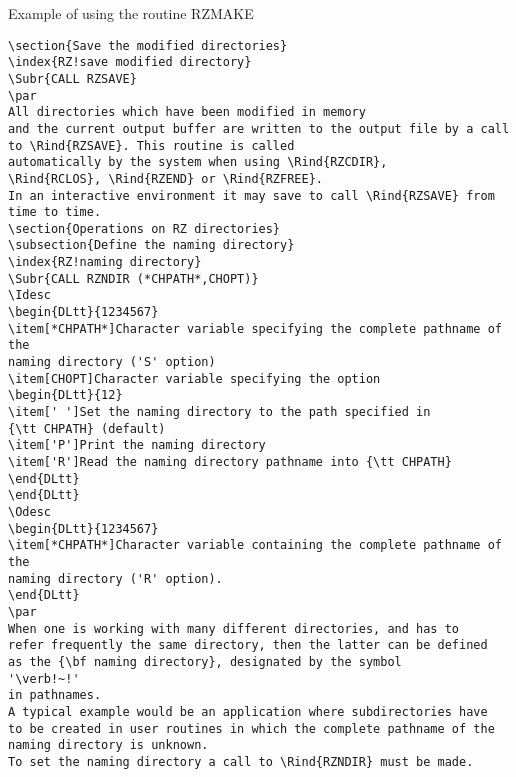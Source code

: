 \begin{XMPt}{Example of using the routine RZMAKE}
\begin{verbatim}
\section{Save the modified directories}
\index{RZ!save modified directory}
\Subr{CALL RZSAVE}
\par 
All directories which have been modified in memory
and the current output buffer are written to the output file by a call
to \Rind{RZSAVE}. This routine is called
automatically by the system when using \Rind{RZCDIR}, 
\Rind{RCLOS}, \Rind{RZEND} or \Rind{RZFREE}.
In an interactive environment it may save to call \Rind{RZSAVE} from
time to time.
\section{Operations on RZ directories}
\subsection{Define the naming directory}
\index{RZ!naming directory}
\Subr{CALL RZNDIR (*CHPATH*,CHOPT)}
\Idesc
\begin{DLtt}{1234567}
\item[*CHPATH*]Character variable specifying the complete pathname of the
naming directory ('S' option)
\item[CHOPT]Character variable specifying the option
\begin{DLtt}{12}
\item[' ']Set the naming directory to the path specified in
{\tt CHPATH} (default)
\item['P']Print the naming directory
\item['R']Read the naming directory pathname into {\tt CHPATH}
\end{DLtt}
\end{DLtt}
\Odesc
\begin{DLtt}{1234567}
\item[*CHPATH*]Character variable containing the complete pathname of the
naming directory ('R' option).
\end{DLtt}
\par 
When one is working with many different directories, and has to
refer frequently the same directory, then the latter can be defined
as the {\bf naming directory}, designated by the symbol
'\verb!~!'
in pathnames.
A typical example would be an application where subdirectories have
to be created in user routines in which the complete pathname of the
naming directory is unknown.
To set the naming directory a call to \Rind{RZNDIR} must be made.

\end{verbatim}
\end{XMPt}
